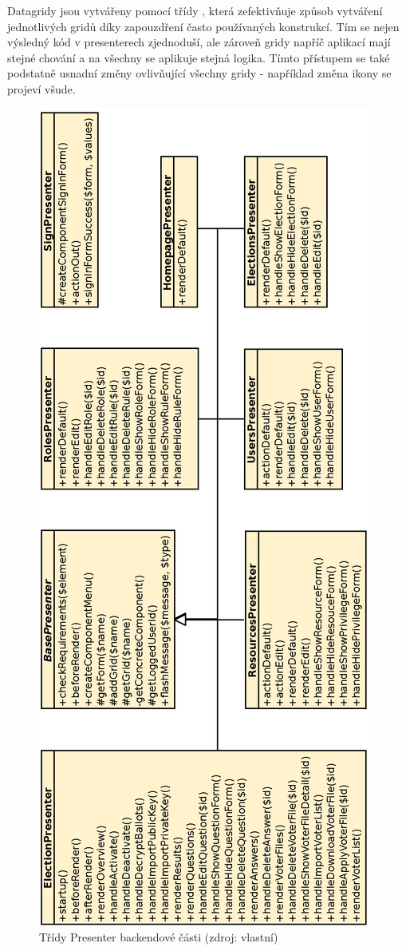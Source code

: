 Datagridy jsou vytvářeny pomocí třídy , která zefektivňuje způsob vytváření jednotlivých gridů díky zapouzdření často používaných konstrukcí. Tím se nejen výsledný kód v presenterech zjednoduší, ale zároveň gridy napříč aplikací mají stejné chování a na všechny se aplikuje stejná logika. Tímto přístupem se také podstatně usnadní změny ovlivňující všechny gridy - například změna ikony se projeví všude.

\begin{figure}[h]
	\centering
	\includegraphics[height=\textheight]{svg/backendPresentersPortrait.eps}
	\captionsetup{width=\linewidth}
	\caption[Třídy Presenter backendové části]{Třídy Presenter backendové části (zdroj: vlastní)}
	\label{fig:BackendPresenters}
\end{figure}

